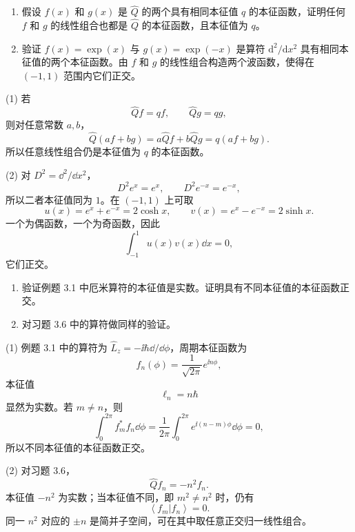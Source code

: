 \begin{question}
\begin{enumerate}
\item 假设 $f(x)$ 和 $g(x)$ 是 $\hat Q$ 的两个具有相同本征值 $q$ 的本征函数，证明任何 $f$ 和 $g$ 的线性组合也都是 $\hat Q$ 的本征函数，且本征值为 $q$。
\item 验证 $f(x)=\exp(x)$ 与 $g(x)=\exp(-x)$ 是算符 $\mathrm d^2/\mathrm dx^2$ 具有相同本征值的两个本征函数。由 $f$ 和 $g$ 的线性组合构造两个波函数，使得在 $(-1,1)$ 范围内它们正交。
\end{enumerate}
\end{question}
\begin{solution}
(1) 若
\[
\hat Q f=qf,
\qquad
\hat Q g=qg,
\]
则对任意常数 $a,b$，
\[
\hat Q(af+bg)=a\hat Qf+b\hat Qg=q(af+bg).
\]
所以任意线性组合仍是本征值为 $q$ 的本征函数。

(2) 对 $D^2=\dd^2/\dd x^2$，
\[
D^2e^x=e^x,
\qquad
D^2e^{-x}=e^{-x},
\]
所以二者本征值同为 $1$。在 $(-1,1)$ 上可取
\[
u(x)=e^x+e^{-x}=2\cosh x,
\qquad
v(x)=e^x-e^{-x}=2\sinh x.
\]
一个为偶函数，一个为奇函数，因此
\[
\int_{-1}^{1}u(x)v(x)\dd x=0,
\]
它们正交。
\end{solution}

\begin{question}
\begin{enumerate}
\item 验证例题 3.1 中厄米算符的本征值是实数。证明具有不同本征值的本征函数正交。
\item 对习题 3.6 中的算符做同样的验证。
\end{enumerate}
\end{question}
\begin{solution}
(1) 例题 3.1 中的算符为 $\hat L_z=-\ii\hbar\dd/\dd\phi$，周期本征函数为
\[
f_n(\phi)=\frac1{\sqrt{2\pi}}e^{\ii n\phi},
\]
本征值
\[
\ell_n=n\hbar
\]
显然为实数。若 $m\ne n$，则
\[
\int_0^{2\pi} f_m^*f_n\dd\phi
=\frac1{2\pi}\int_0^{2\pi}e^{\ii(n-m)\phi}\dd\phi=0,
\]
所以不同本征值的本征函数正交。

(2) 对习题 3.6，
\[
\hat Qf_n=-n^2f_n.
\]
本征值 $-n^2$ 为实数；当本征值不同，即 $m^2\ne n^2$ 时，仍有
\[
\left\langle f_m|f_n \right\rangle=0.
\]
同一 $n^2$ 对应的 $\pm n$ 是简并子空间，可在其中取任意正交归一线性组合。
\end{solution}


